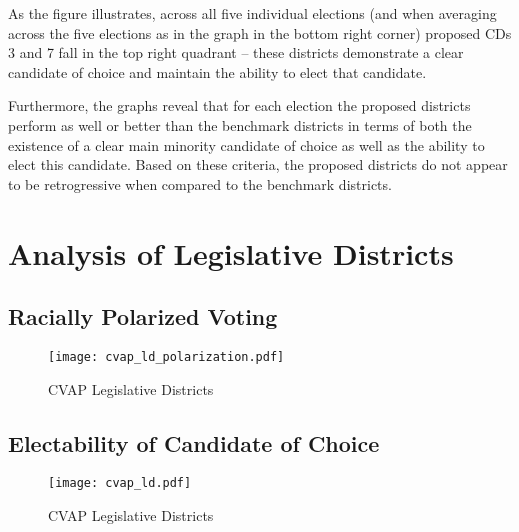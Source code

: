 \documentclass[12pt]{scrartcl}
\begin{document}
As the figure illustrates, across all five individual elections (and when averaging across the five elections as in the graph in the bottom right corner) proposed CDs 3 and 7 fall in the top right quadrant -- these districts demonstrate a clear candidate of choice and maintain the ability to elect that candidate. 

Furthermore, the graphs reveal that for each election the proposed districts perform as well or better than the benchmark districts in terms of both the existence of a clear main minority candidate of choice as well as the ability to elect this candidate. Based on these criteria, the proposed districts do not appear to be retrogressive when compared to the benchmark districts.



\section{Analysis of Legislative Districts}

\subsection{Racially Polarized Voting}

\begin{figure}[ht]
\begin{centering}
\texttt{[image: cvap\_ld\_polarization.pdf]}
\caption{CVAP Legislative Districts}
\end{centering}
\end{figure}

\subsection{Electability of Candidate of Choice}

\begin{figure}[ht]
\begin{centering}
\texttt{[image: cvap\_ld.pdf]}
\caption{CVAP Legislative Districts}
\end{centering}
\end{figure}
\end{document}
